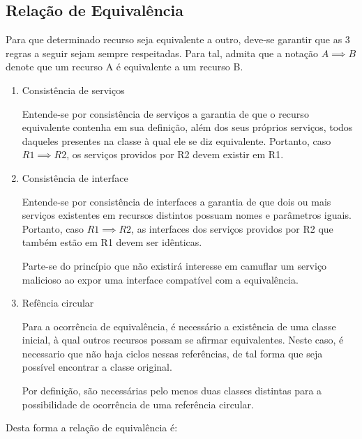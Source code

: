 \subsection{Relação de Equivalência}

Para que determinado recurso seja equivalente a outro, deve-se garantir que as 3 regras a seguir sejam sempre respeitadas. Para tal, admita que a notação $A \implies B$ denote que um recurso A é equivalente a um recurso B.

\begin{enumerate}
	\item Consistência de serviços

		Entende-se por consistência de serviços a garantia de que o recurso equivalente contenha em sua definição, além dos seus próprios serviços, todos daqueles presentes na classe à qual ele se diz equivalente. Portanto, caso $R1 \implies R2$, os serviços providos por R2 devem existir em R1.
	\item Consistência de interface

		Entende-se por consistência de interfaces a garantia de que dois ou mais serviços existentes em recursos distintos possuam nomes e parâmetros iguais. Portanto, caso $R1 \implies R2$, as interfaces dos serviços providos por R2 que também estão em R1 devem ser idênticas.

		Parte-se do princípio que não existirá interesse em camuflar um serviço malicioso ao expor uma interface compatível com a equivalência.
	\item Refência circular

		Para a ocorrência de equivalência, é necessário a existência de uma classe inicial, à qual outros recursos possam se afirmar equivalentes. Neste caso, é necessario que não haja ciclos nessas referências, de tal forma que seja possível encontrar a classe original.

		Por definição, são necessárias pelo menos duas classes distintas para a possibilidade de ocorrência de uma referência circular.
\end{enumerate}

Desta forma a relação de equivalência é:

